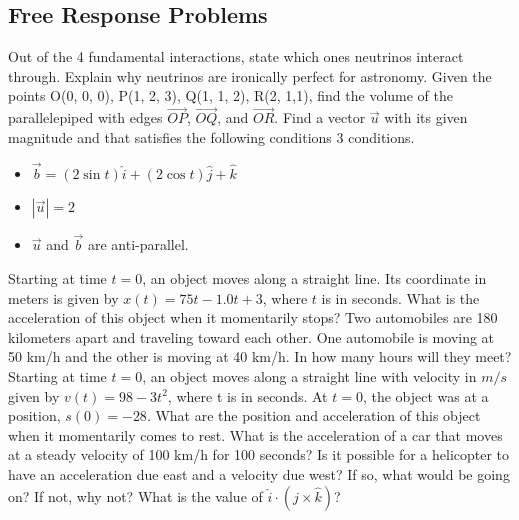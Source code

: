 \documentclass[12pt,addpoints]{exam}
\begin{document}
{{{\begin{questions}
					\subsection*{Free Response Problems}
					\question[1] Out of the 4 fundamental interactions, state which ones neutrinos interact through. Explain why neutrinos are ironically perfect for astronomy. \vspace{1.5in}
					\question[1] Given the points O(0, 0, 0), P(1, 2, 3), Q(1, 1, 2), R(2, 1,1), find the volume of the parallelepiped with edges $\overrightarrow{OP}$, $\overrightarrow{OQ}$, and $\overrightarrow{OR}$.\vspace{1.5in}
					\question[1] Find a vector $\vec{u}$ with its given magnitude and that satisfies the following conditions 3 conditions.
					\begin{itemize}
						\item $\vec b=(2\sin t)\hat{i}+(2\cos t)\hat{j}+\hat{k}$
						\item $|\vec u|=2$ 
						\item $\vec{u}$ and $\vec{b}$ are anti-parallel.
					\end{itemize}
					\vspace{1.4in}
					\question[1] Starting at time $t = 0$, an object moves along a straight line. Its coordinate in meters is given by $x(t) = 75t-1.0t+3$, where $t$ is in seconds. What is the acceleration of this object when it momentarily stops?\vspace{1.5in}
					\question[1] Two automobiles are 180 kilometers apart and traveling toward each other. One automobile is moving at 50 km/h and the other is moving at 40 km/h. In how many hours will they meet?\vspace{1.5in}
					\question[2] Starting at time $t = 0$, an object moves along a straight line with velocity in $m/s$ given by $v(t) = 98-3t^2$, where t is in seconds. At $t=0$, the object was at a position, $s(0)=-28$. What are the position and acceleration of this object when it momentarily comes to rest.\vspace{1.5in}
					\question[1] What is the acceleration of a car that moves at a steady velocity of 100 km/h for 100 seconds?\vspace{1in}
					\question[1] Is it possible for a helicopter to have an acceleration due east and a velocity due west? If so, what would be going on? If not, why not?\vspace{1in}
					\question[1] What is the value of $\hat{i}\cdot(\hat{j}\times\hat{k})$?\vspace{1.3in}
					\end{questions}
					\begin{center}

\end{center}}}}
\end{document}
